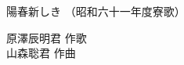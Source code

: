 \documentclass[10pt,b5j]{tarticle} %
\begin{document}
\begin{minipage}[c]{0.7\hsize} %
    \begin{center}
        {\LARGE
            陽春新しき %
        }
        {\small 
            （昭和六十一年度寮歌） %
        }
    \end{center}
\end{minipage}
\begin{minipage}[c]{0.3\hsize} %
    \begin{flushright} %
        原澤辰明君 作歌\\山森聡君 作曲 %
    \end{flushright}
\end{minipage}
\end{document}
